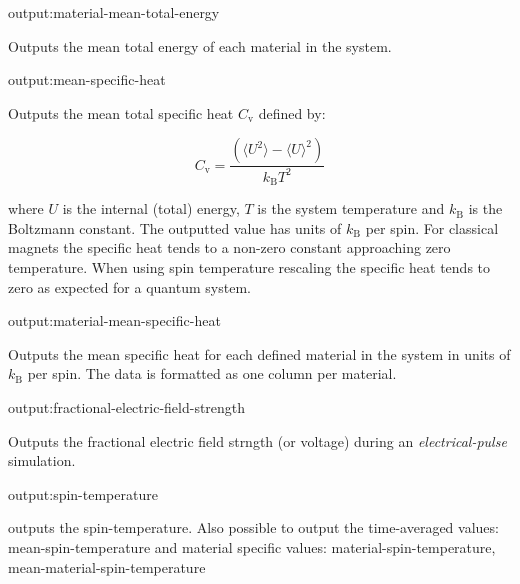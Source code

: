 {\zicf output:material-mean-total-energy} Outputs the mean total energy of each material in the system.

{\zicf output:mean-specific-heat} Outputs the mean total specific heat $C_{\mathrm{v}}$ defined by:

\begin{equation*}
C_{\mathrm{v}} = \frac{\left(\langle U^2 \rangle - \langle U \rangle^2 \right)}{k_{\mathrm{B}} T^2}
\end{equation*}

\noindent where $U$ is the internal (total) energy, $T$ is the system temperature and $k_{\mathrm{B}}$ is the Boltzmann constant. The outputted value has units of $k_{\mathrm{B}}$ per spin. For classical magnets the specific heat tends to a non-zero constant approaching zero temperature. When using spin temperature rescaling the specific heat tends to zero as expected for a quantum system.

{\zicf output:material-mean-specific-heat} Outputs the mean specific heat for each defined material in the system in units of $k_{\mathrm{B}}$ per spin. The data is formatted as one column per material.

{\zicf output:fractional-electric-field-strength}
Outputs the fractional electric field strngth (or voltage) during an \textit{electrical-pulse} simulation.


{\zicf output:spin-temperature} outputs the spin-temperature. Also possible to output the time-averaged values: mean-spin-temperature and material specific values: material-spin-temperature, mean-material-spin-temperature

